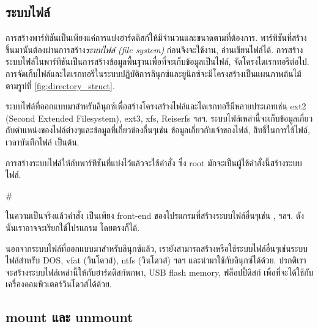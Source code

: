 \begin{thwbr}
\subsection{ระบบไฟล์}
การสร้างพาร์ทิชันเป็นเพียงแค่การแบ่งฮาร์ดดิสก์ให้มีจำนวนและขนาดตามที่ต้องการ. พาร์ทิชันที่สร้างขึ้นมานั้นต้องผ่านการสร้าง\emph{ระบบไฟล์ (file system)} ก่อนจึงจะใช้งาน, อ่านเขียนไฟล์ได้. การสร้างระบบไฟล์ในพาร์ทิชันเป็นการสร้างข้อมูลพื้นฐานเพื่อที่จะเก็บข้อมูลเป็นไฟล์, จัดโครงไดเรกทอรีต่อไป. การจัดเก็บไฟล์และไดเรกทอรีในระบบปฏิบัติการลินุกซ์และยูนิกซ์จะมีโครงสร้างเป็นแผนภาพต้นไม้ตามรูปที่ \ref{fig:directory_struct}.

\begin{figure}[!htb]
\end{figure}

ระบบไฟล์ที่ออกแบบมาสำหรับลินุกซ์เพื่อสร้างโครงสร้างไฟล์และไดเรกทอรีมีหลายประเภทเช่น ext2 (Second Extended Filesystem), ext3, xfs, Reiserfs ฯลฯ. ระบบไฟล์เหล่านี้จะเก็บข้อมูลเกี่ยวกับตำแหน่งของไฟล์ต่างๆและข้อมูลที่เกี่ยวข้องอื่นๆเช่น ข้อมูลเกี่ยวกับเจ้าของไฟล์, สิทธิ์ในการใช้ไฟล์, เวลาบันทึกไฟล์ เป็นต้น. 


การสร้างระบบไฟล์ให้กับพาร์ทิชันที่แบ่งไว้แล้วจะใช้คำสั่ง  ซึ่ง root มักจะเป็นผู้ใช้คำสั่งนี้สร้างระบบไฟล์.

\begin{MyExample}
\begin{MyEx}
# 
\end{MyEx}
\end{MyExample}

ในความเป็นจริงแล้วคำสั่ง  เป็นเพียง front-end ของโปรแกรมที่สร้างระบบไฟล์อื่นๆเช่น ,  ฯลฯ. ดังนั้นเราอาจจะเรียกใช้โปรแกรม  โดยตรงก็ได้.

นอกจากระบบไฟล์ที่ออกแบบมาสำหรับลินุกซ์แล้ว, เรายังสามารถสร้างหรือใช้ระบบไฟล์อื่นๆเช่นระบบไฟล์สำหรับ DOS, vfat (วินโดวส์), ntfs (วินโดวส์) ฯลฯ และนำมาใช้กับลินุกซ์ได้ด้วย. ปรกติเราจะสร้างระบบไฟล์เหล่านี้ให้กับฮาร์ดดิสก์พกพา, USB flash memory, ฟล็อปปี้ดิสก์ เพื่อที่จะได้ใช้กับเครื่องคอมพิวเตอร์วินโดวส์ได้ด้วย. 

\subsection{mount และ unmount}


\end{thwbr}
